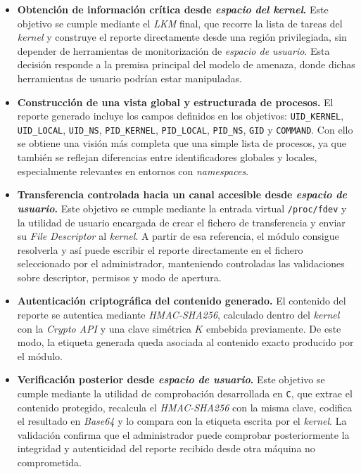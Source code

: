 \begin{itemize}
    \item \textbf{Obtención de información crítica desde \textit{espacio del kernel}.} Este objetivo se cumple mediante el \textit{LKM} final, que recorre la lista de tareas del \textit{kernel} y construye el reporte directamente desde una región privilegiada, sin depender de herramientas de monitorización de \textit{espacio de usuario}. Esta decisión responde a la premisa principal del modelo de amenaza, donde dichas herramientas de usuario podrían estar manipuladas.
    
    \item \textbf{Construcción de una vista global y estructurada de procesos.} El reporte generado incluye los campos definidos en los objetivos: \texttt{UID\_KERNEL}, \texttt{UID\_LOCAL}, \texttt{UID\_NS}, \texttt{PID\_KERNEL}, \texttt{PID\_LOCAL}, \texttt{PID\_NS}, \texttt{GID} y \texttt{COMMAND}. Con ello se obtiene una visión más completa que una simple lista de procesos, ya que también se reflejan diferencias entre identificadores globales y locales, especialmente relevantes en entornos con \textit{namespaces}.
    
    \item \textbf{Transferencia controlada hacia un canal accesible desde \textit{espacio de usuario}.} Este objetivo se cumple mediante la entrada virtual \texttt{/proc/fdev} y la utilidad de usuario encargada de crear el fichero de transferencia y enviar su \textit{File Descriptor} al \textit{kernel}. A partir de esa referencia, el módulo consigue resolverla y así puede escribir el reporte directamente en el fichero seleccionado por el administrador, manteniendo controladas las validaciones sobre descriptor, permisos y modo de apertura.
    
    \item \textbf{Autenticación criptográfica del contenido generado.} El contenido del reporte se autentica mediante \textit{HMAC-SHA256}, calculado dentro del \textit{kernel} con la \textit{Crypto API} y una clave simétrica \(K\) embebida previamente. De este modo, la etiqueta generada queda asociada al contenido exacto producido por el módulo.
    
    \item \textbf{Verificación posterior desde \textit{espacio de usuario}.} Este objetivo se cumple mediante la utilidad de comprobación desarrollada en \texttt{C}, que extrae el contenido protegido, recalcula el \textit{HMAC-SHA256} con la misma clave, codifica el resultado en \textit{Base64} y lo compara con la etiqueta escrita por el \textit{kernel}. La validación confirma que el administrador puede comprobar posteriormente la integridad y autenticidad del reporte recibido desde otra máquina no comprometida.
    

\end{itemize}
